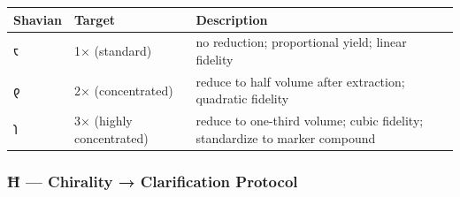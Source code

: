 \begin{longtable}[]{@{}lll@{}}
\toprule
\begin{minipage}[b]{0.30\columnwidth}\raggedright
Shavian\strut
\end{minipage} & \begin{minipage}[b]{0.30\columnwidth}\raggedright
Target\strut
\end{minipage} & \begin{minipage}[b]{0.30\columnwidth}\raggedright
Description\strut
\end{minipage}\tabularnewline
\midrule
\endhead
\begin{minipage}[t]{0.30\columnwidth}\raggedright
𐑱\strut
\end{minipage} & \begin{minipage}[t]{0.30\columnwidth}\raggedright
1× (standard)\strut
\end{minipage} & \begin{minipage}[t]{0.30\columnwidth}\raggedright
no reduction; proportional yield; linear fidelity\strut
\end{minipage}\tabularnewline
\begin{minipage}[t]{0.30\columnwidth}\raggedright
𐑞\strut
\end{minipage} & \begin{minipage}[t]{0.30\columnwidth}\raggedright
2× (concentrated)\strut
\end{minipage} & \begin{minipage}[t]{0.30\columnwidth}\raggedright
reduce to half volume after extraction; quadratic fidelity\strut
\end{minipage}\tabularnewline
\begin{minipage}[t]{0.30\columnwidth}\raggedright
𐑐\strut
\end{minipage} & \begin{minipage}[t]{0.30\columnwidth}\raggedright
3× (highly concentrated)\strut
\end{minipage} & \begin{minipage}[t]{0.30\columnwidth}\raggedright
reduce to one-third volume; cubic fidelity; standardize to marker
compound\strut
\end{minipage}\tabularnewline
\bottomrule
\end{longtable}

\hypertarget{ux127-chirality-clarification-protocol}{%
\subsubsection{Ħ --- Chirality → Clarification
Protocol}\label{ux127-chirality-clarification-protocol}}


